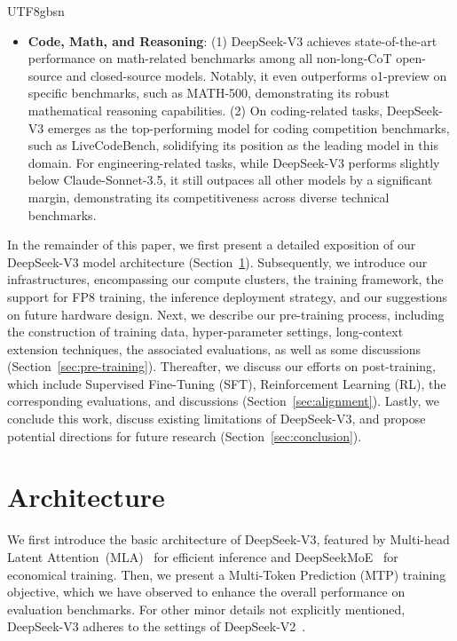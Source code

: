 \documentclass[11pt, a4paper, logo, copyright, nonumbering]{deepseek}
\newcommand{\dsvii}{DeepSeek-V2}
\newcommand{\dsattn}{MLA}
\newcommand{\dsmoe}{DeepSeekMoE}
\newcommand{\dsviii}{DeepSeek-V3}
\begin{document}
\begin{CJK*}{UTF8}{gbsn}
\begin{itemize}[topsep=0pt]
    \item \textbf{Code, Math, and Reasoning}: 
    (1)
    \dsviii{} achieves state-of-the-art performance on math-related benchmarks among all non-long-CoT open-source and closed-source models. 
    Notably, it even outperforms o1-preview on specific benchmarks, such as MATH-500, demonstrating its robust mathematical reasoning capabilities. 
    (2)
    On coding-related tasks, \dsviii{} emerges as the top-performing model for coding competition benchmarks, such as LiveCodeBench, solidifying its position as the leading model in this domain. 
    For engineering-related tasks, while \dsviii{} performs slightly below Claude-Sonnet-3.5, it still outpaces all other models by a significant margin, demonstrating its competitiveness across diverse technical benchmarks.
\end{itemize}

In the remainder of this paper, we first present a detailed exposition of our \dsviii{} model architecture (Section~\ref{sec:arch}). 
Subsequently, we introduce our infrastructures, encompassing our compute clusters, the training framework, the support for FP8 training, the inference deployment strategy, and our suggestions on future hardware design.
Next, we describe our pre-training process, including the construction of training data, hyper-parameter settings, long-context extension techniques, the associated evaluations, as well as some discussions (Section~\ref{sec:pre-training}). 
Thereafter, we discuss our efforts on post-training, which include Supervised Fine-Tuning (SFT), Reinforcement Learning (RL), the corresponding evaluations, and discussions (Section~\ref{sec:alignment}). 
Lastly, we conclude this work, discuss existing limitations of \dsviii{}, and propose potential directions for future research (Section~\ref{sec:conclusion}).

\section{Architecture}
\label{sec:arch}

We first introduce the basic architecture of \dsviii{}, featured by Multi-head Latent Attention~(\dsattn{})~\citep{dsvii} for efficient inference and \dsmoe{}~\citep{deepseekmoe} for economical training.
Then, we present a Multi-Token Prediction (MTP) training objective, which we have observed to enhance the overall performance on evaluation benchmarks.
For other minor details not explicitly mentioned, \dsviii{} adheres to the settings of \dsvii{}~\citep{dsvii}. 


\end{CJK*}
\end{document}
